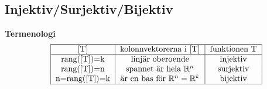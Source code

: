 \newpage

\subsection{Injektiv/Surjektiv/Bijektiv}
\textbf{Termenologi}
\begin{align*}
  &\quad
  \begin{tabular}{ |c|c|c| } 
    \hline
    [T]           & kolonnvektorerna i [T]                    & funktionen T \\
    \hline
    rang([T])=k   & linjär oberoende                          & injektiv \\ 
    rang([T])=n   & spannet är hela $\mathbb{R}^n$            & surjektiv \\
    n=rang([T])=k & är en bas för $\mathbb{R}^n=\mathbb{R}^k$ & bijektiv \\
    \hline
  \end{tabular} \\
\end{align*}
